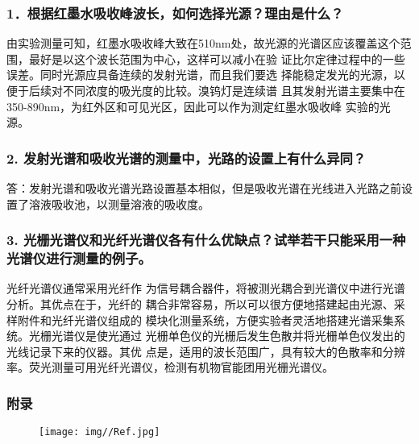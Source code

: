 \documentclass[12pt,a4paper,UTF8]{ctexart}
\begin{document}
\subsubsection*{1．根据红墨水吸收峰波长，如何选择光源？理由是什么？}
由实验测量可知，红墨水吸收峰大致在510nm处，故光源的光谱区应该覆盖这个范围，最好是以这个波长范围为中心，这样可以减小在验
证比尔定律过程中的一些误差。同时光源应具备连续的发射光谱，而且我们要选
择能稳定发光的光源，以便于后续对不同浓度的吸光度的比较。溴钨灯是连续谱
且其发射光谱主要集中在350-890nm，为红外区和可见光区，因此可以作为测定红墨水吸收峰
实验的光源。

\subsubsection*{2. 发射光谱和吸收光谱的测量中，光路的设置上有什么异同？}
答：发射光谱和吸收光谱光路设置基本相似，但是吸收光谱在光线进入光路之前设
置了溶液吸收池，以测量溶液的吸收度。

\subsubsection*{3. 光栅光谱仪和光纤光谱仪各有什么优缺点？试举若干只能采用一种光谱仪进行测量的例子。}
光纤光谱仪通常采用光纤作
为信号耦合器件，将被测光耦合到光谱仪中进行光谱分析。其优点在于，光纤的
耦合非常容易，所以可以很方便地搭建起由光源、采样附件和光纤光谱仪组成的
模块化测量系统，方便实验者灵活地搭建光谱采集系统。光栅光谱仪是使光通过
光栅单色仪的光栅后发生色散并将光栅单色仪发出的光线记录下来的仪器。其优
点是，适用的波长范围广，具有较大的色散率和分辨率。荧光测量可用光纤光谱仪，检测有机物官能团用光栅光谱仪。

\subsubsection*{附录}
\begin{figure}[htbp]
	\centering
	\texttt{[image: img//Ref.jpg]}
\end{figure}
\end{document}
